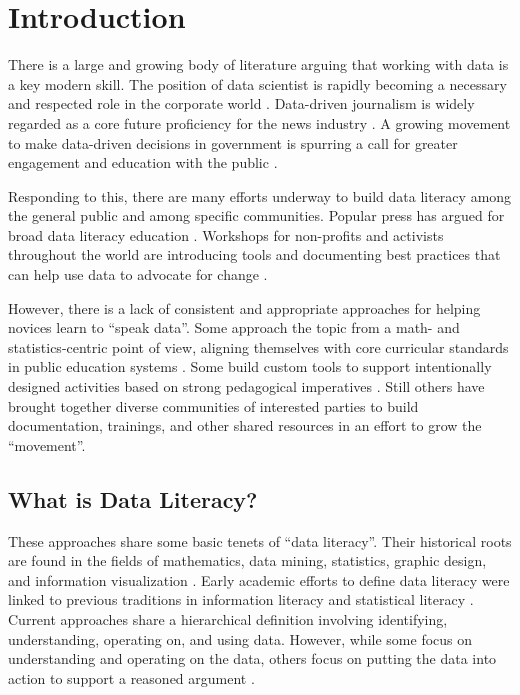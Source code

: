 \documentclass{acm_proc_article-sp}
\begin{document}
\section{Introduction}

There is a large and growing body of literature arguing that working with data is a key modern skill.  The position of data scientist is rapidly becoming a necessary and respected role in the corporate world \cite{patil_data_2012}.  Data-driven journalism is widely regarded as a core future proficiency for the news industry \cite{howard_art_2014}.  A growing movement to make data-driven decisions in government is spurring a call for greater engagement and education with the public \cite{gurstein_open_2011,philip_framework_2013}.  

Responding to this, there are many efforts underway to build data literacy among the general public and among specific communities. Popular press has argued for broad data literacy education \cite{harris_data_2012,maycotte_data_2014}. Workshops for non-profits and activists throughout the world are introducing tools and documenting best practices that can help use data to advocate for change \cite{_visualizing_2014}.

However, there is a lack of consistent and appropriate approaches for helping novices learn to \enquote{speak data}.  Some approach the topic from a math- and statistics-centric point of view, aligning themselves with core curricular standards in public education systems \cite{maine_2015}. Some build custom tools to support intentionally designed activities based on strong pedagogical imperatives \cite{williams_city_2015}. Still others have brought together diverse communities of interested parties to build documentation, trainings, and other shared resources in an effort to grow the \enquote{movement}\cite{gray_data_2012}.

\subsection{What is Data Literacy?}

These approaches share some basic tenets of \enquote{data literacy}. Their historical roots are found in the fields of mathematics, data mining, statistics, graphic design, and information visualization \cite{fry_computational_2004}. Early academic efforts to define data literacy were linked to previous traditions in information literacy and statistical literacy \cite{schield_information_2004,hunt_challenges_2004}.  Current approaches share a hierarchical definition involving identifying, understanding, operating on, and using data.  However, while some focus on understanding and operating on the data, others focus on putting the data into action to support a reasoned argument \cite{deahl_better_2014}.
\end{document}
